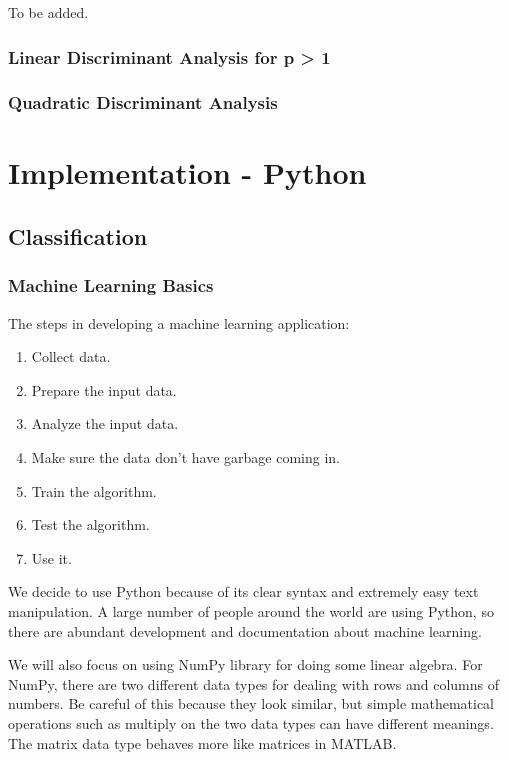 \documentclass{article}
\begin{document}
To be added.

\subsubsection{Linear Discriminant Analysis for p > 1}
\subsubsection{Quadratic Discriminant Analysis}


\section{Implementation - Python}
\subsection{Classification}
\subsubsection{Machine Learning Basics}
The steps in developing a machine learning application:
\begin{enumerate}
	\item Collect data. \\
	\item Prepare the input data. \\
	\item Analyze the input data. \\
	\item Make sure the data don't have garbage coming in. \\
	\item Train the algorithm. \\
	\item Test the algorithm. \\
	\item Use it. \\
\end{enumerate}
We decide to use Python because of its clear syntax and extremely easy text manipulation. A large number of people around the world are using Python, so there are abundant development and documentation about machine learning.

We will also focus on using NumPy library for doing some linear algebra. For NumPy, there are two different data types for dealing with rows and columns of numbers. Be careful of this because they look similar, but simple mathematical operations such as multiply on the two data types can have different meanings. The matrix data type behaves more like matrices in MATLAB.
\end{document}
